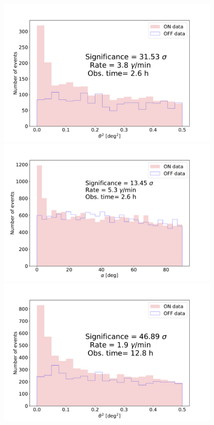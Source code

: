\documentclass[main.tex]{subfiles}
\begin{document}
\begin{figure}
  \centering
  \includegraphics[width=1\textwidth]{Pictures/thetaplot_20200118_int500_gammaness0-600000.pdf}
  \endminipage
  \includegraphics[width=1\textwidth]{Pictures/alphaplot_20200118_int500_gammaness0-600000.pdf}
  \endminipage \\
  \includegraphics[width=1\textwidth]{Pictures/thetaplot_int500_gammaness0-6.pdf}

\end{figure}
\end{document}
